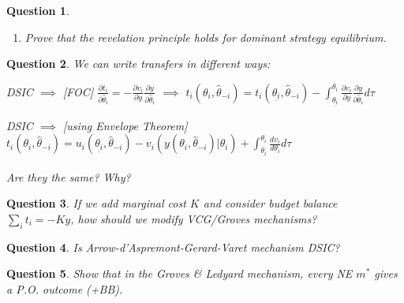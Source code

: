\documentclass[11pt,leqno]{article}
\newtheorem{HW}{Question}
\begin{document}
\begin{HW}
\begin{enumerate}
    \item  Prove that the revelation principle holds for dominant strategy equilibrium.
\end{enumerate}
\end{HW}

\begin{HW}

We can write transfers in different ways:

DSIC $\implies$ [FOC] $\frac{\partial t_{i}}{\partial \hat{\theta}_{i}}=-\frac{\partial v_{i}}{\partial y}\frac{\partial y}{\partial \hat{\theta}_{i}}$ $\implies$ $t_{i}(\theta_{i},\hat{\theta}_{-i})=t_{i}(\underset{\bar{}}{\theta_{i}},\hat{\theta}_{-i})-\int _{\underset{\bar{}}{\theta_{i}}}^{\theta_{i}}\frac{\partial v_{i}}{\partial y}\frac{\partial y}{\partial \hat{\theta}_{i}}d\tau$

DSIC $\implies$ [using Envelope Theorem] $t_{i}(\theta_{i},\hat{\theta}_{-i})=u_{i}(\underset{\bar{}}{\theta_{i}},\hat{\theta}_{-i})-v_{i}(y(\theta_{i},\hat{\theta}_{-i})|\theta_{i})+\int _{\underset{\bar{}}{\theta_{i}}}^{\theta_{i}}\frac{d v_{i}}{d \theta_{i}}d\tau$

Are they the same? Why?
\end{HW}

\begin{HW}
If we add marginal cost $K$ and consider budget balance $\sum_{i}t_{i}=-Ky$, how should we modify VCG/Groves mechanisms?
\end{HW}

\begin{HW}
    Is Arrow-d'Aspremont-Gerard-Varet mechanism DSIC?
\end{HW}

\begin{HW}
Show that in the Groves \& Ledyard mechanism, every NE $m^{*}$ gives a P.O. outcome (+BB).
\end{HW}
\end{document}
